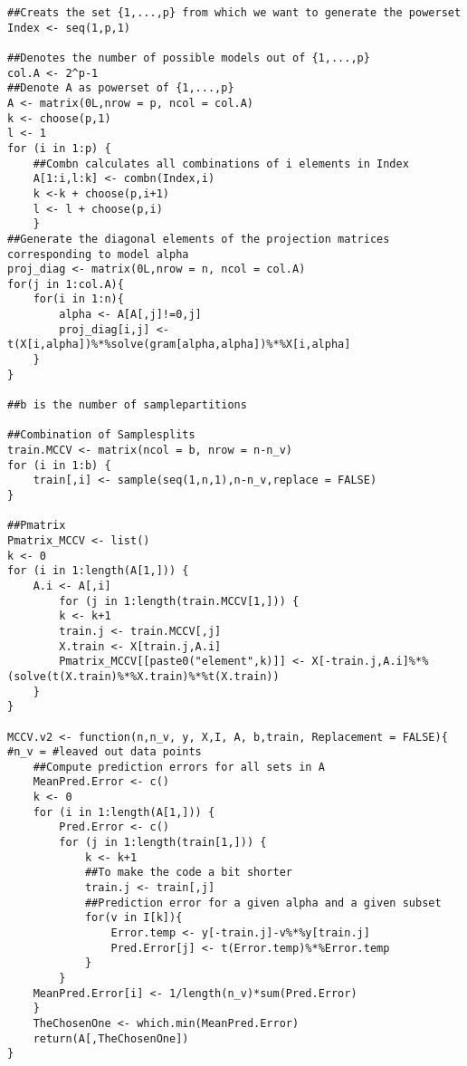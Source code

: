 \documentclass[Research_Module_ES.tex]{subfiles}
\begin{document}
\begin{lstlisting}[title={Monte Carlo Cross-Validation Function (Speeded up Version)}]
##Creats the set {1,...,p} from which we want to generate the powerset
Index <- seq(1,p,1)    

##Denotes the number of possible models out of {1,...,p}
col.A <- 2^p-1
##Denote A as powerset of {1,...,p}
A <- matrix(0L,nrow = p, ncol = col.A)      
k <- choose(p,1)
l <- 1
for (i in 1:p) {
	##Combn calculates all combinations of i elements in Index 
	A[1:i,l:k] <- combn(Index,i)             
	k <-k + choose(p,i+1)
	l <- l + choose(p,i)
	}
##Generate the diagonal elements of the projection matrices corresponding to model alpha
proj_diag <- matrix(0L,nrow = n, ncol = col.A)
for(j in 1:col.A){
	for(i in 1:n){
		alpha <- A[A[,j]!=0,j]
		proj_diag[i,j] <- t(X[i,alpha])%*%solve(gram[alpha,alpha])%*%X[i,alpha]
	}
}

##b is the number of samplepartitions

##Combination of Samplesplits
train.MCCV <- matrix(ncol = b, nrow = n-n_v)
for (i in 1:b) {
	train[,i] <- sample(seq(1,n,1),n-n_v,replace = FALSE)
}

##Pmatrix
Pmatrix_MCCV <- list()
k <- 0
for (i in 1:length(A[1,])) {
	A.i <- A[,i]
		for (j in 1:length(train.MCCV[1,])) {
		k <- k+1
		train.j <- train.MCCV[,j]
		X.train <- X[train.j,A.i] 
		Pmatrix_MCCV[[paste0("element",k)]] <- X[-train.j,A.i]%*%(solve(t(X.train)%*%X.train)%*%t(X.train))
	}
}

MCCV.v2 <- function(n,n_v, y, X,I, A, b,train, Replacement = FALSE){  #n_v = #leaved out data points
	##Compute prediction errors for all sets in A
	MeanPred.Error <- c()
	k <- 0
	for (i in 1:length(A[1,])) {
		Pred.Error <- c()
		for (j in 1:length(train[1,])) {
			k <- k+1
			##To make the code a bit shorter
			train.j <- train[,j]                 
			##Prediction error for a given alpha and a given subset
			for(v in I[k]){
				Error.temp <- y[-train.j]-v%*%y[train.j]
				Pred.Error[j] <- t(Error.temp)%*%Error.temp
			}
		}
	MeanPred.Error[i] <- 1/length(n_v)*sum(Pred.Error)
	}
	TheChosenOne <- which.min(MeanPred.Error)
	return(A[,TheChosenOne])
}

\end{lstlisting}
\end{document}
